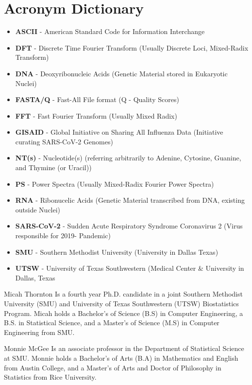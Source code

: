 \documentclass[12pt,journal,compsoc]{IEEEtran}
\begin{document}
\section{Acronym Dictionary} 
{\small
\begin{itemize} 
\item \textbf{ASCII} - American Standard Code for Information Interchange
\item \textbf{DFT} - Discrete Time Fourier Transform (Usually Discrete Loci, Mixed-Radix Transform)
\item \textbf{DNA} - Deoxyribonucleic Acids (Genetic Material stored in Eukaryotic Nuclei)
\item \textbf{FASTA/Q} - Fast-All File format (Q - Quality Scores)
\item \textbf{FFT} - Fast Fourier Transform (Usually Mixed Radix)
\item \textbf{GISAID} - Global Initiative on Sharing All Influenza Data (Initiative curating SARS-CoV-2 Genomes)
\item \textbf{NT(s)} - Nucleotide(s) (referring arbitrarily to Adenine, Cytosine, Guanine, and Thymine (or Uracil))
\item \textbf{PS} - Power Spectra (Usually Mixed-Radix Fourier Power Spectra)
\item \textbf{RNA} - Ribonucelic Acids (Genetic Material transcribed from DNA, existing outside Nuclei)
\item \textbf{SARS-CoV-2} - Sudden Acute Respiratory Syndrome Coronavirus 2 (Virus responsible for 2019- Pandemic)
\item \textbf{SMU} - Southern Methodist University (University in Dallas Texas) 
\item \textbf{UTSW} - University of Texas Southwestern (Medical Center \& University in Dallas, Texas
\end{itemize} 
}

\begin{IEEEbiographynophoto}{Micah Thornton}
Is a fourth year Ph.D. candidate in a joint Southern Methodist University (SMU) and University of Texas Southwestern (UTSW) Biostatistics Program.  Micah holds a Bachelor's of Science (B.S) in Computer Engineering, a B.S. in Statistical Science, and a Master's of Science (M.S) in Computer Engineering from SMU. 
\end{IEEEbiographynophoto}

\begin{IEEEbiographynophoto}{Monnie McGee} 
Is an associate professor in the Department of Statistical Science at SMU. Monnie holds a Bachelor's of Arts (B.A) in Mathematics and English from Austin College, and a Master's of Arts and Doctor of Philosophy in Statistics from Rice University.  

\end{IEEEbiographynophoto}
\end{document}
